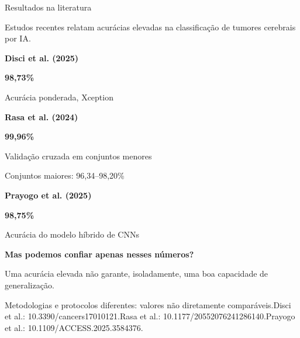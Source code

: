 \documentclass[aspectratio=169,11pt,t]{beamer}
\def\kickertext{}
\newcommand{\kicker}[1]{\gdef\kickertext{#1}}
\newcommand{\source}[1]{\par\vfill{\fontsize{6.5}{7.8}\selectfont\color{muted}#1\par}\vspace{1mm}}
\begin{document}
\kicker{02\enspace PROBLEMA}
\begin{frame}{Resultados na literatura}
\relax
{\small Estudos recentes relatam acurácias elevadas na classificação de tumores cerebrais por IA.\par}
\vspace{1.5mm}
\begin{tcbraster}[raster columns=3,raster equal height,raster column skip=3.5mm]
\begin{tcolorbox}[card,topstripe=teal]
{\scriptsize\bfseries\color{muted}Disci et al. (2025)\par}\vspace{1mm}
{\fontsize{22}{24}\selectfont\bfseries\color{teal}98,73\%\par}\vspace{0.8mm}
{\footnotesize Acurácia ponderada, Xception\par}
\end{tcolorbox}
\begin{tcolorbox}[card,topstripe=teal]
{\scriptsize\bfseries\color{muted}Rasa et al. (2024)\par}\vspace{1.5mm}
{\fontsize{22}{24}\selectfont\bfseries\color{teal}99,96\%\par}\vspace{0.8mm}
{\footnotesize Validação cruzada em conjuntos menores\par}
{\scriptsize\color{muted}Conjuntos maiores: \mbox{96,34--98,20\%}\par}
\end{tcolorbox}
\begin{tcolorbox}[card,topstripe=teal]
{\scriptsize\bfseries\color{muted}Prayogo et al. (2025)\par}\vspace{1.5mm}
{\fontsize{22}{24}\selectfont\bfseries\color{teal}98,75\%\par}\vspace{0.8mm}
{\footnotesize Acurácia do modelo híbrido de CNNs\par}
\end{tcolorbox}
\end{tcbraster}
\vspace{1mm}
\begin{tcolorbox}[tint]
{\normalsize\bfseries Mas podemos confiar apenas nesses números?\par}
\vspace{0.5mm}
Uma acurácia elevada não garante, isoladamente, uma boa capacidade de generalização.
\end{tcolorbox}
\source{Metodologias e protocolos diferentes: valores não diretamente comparáveis.\enspace Disci et al.: 10.3390/cancers17010121.\enspace Rasa et al.: 10.1177/20552076241286140.\enspace Prayogo et al.: 10.1109/ACCESS.2025.3584376.}
\end{frame}
\end{document}
